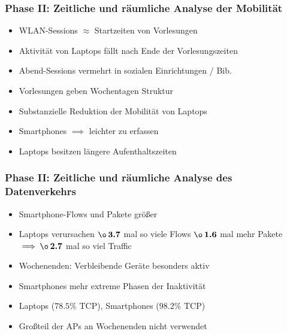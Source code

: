 \documentclass{beamer}
\begin{document}
\begin{frame}
  \frametitle{Phase II: Zeitliche und räumliche Analyse der Mobilität}
  \begin{itemize}
    \item WLAN-Sessions $\approx$ Startzeiten von Vorlesungen
    \item Aktivität von Laptops fällt nach Ende der Vorlesungszeiten
    \item Abend-Sessions vermehrt in sozialen Einrichtungen / Bib.
    \item Vorlesungen geben Wochentagen Struktur
    \item Substanzielle Reduktion der Mobilität von Laptops
    \item Smartphones  $\implies$ leichter zu erfassen
    \item Laptops besitzen längere Aufenthaltszeiten 
  \end{itemize}
\end{frame}

\begin{frame}
  \frametitle{Phase II: Zeitliche und räumliche Analyse des Datenverkehrs}
  \begin{itemize}
    \item Smartphone-Flows und Pakete größer
    \item Laptops verursachen $\boldsymbol{\o \thinspace 3.7}$ mal so viele Flows\newline
    \phantom \quad\quad\quad\quad\quad\quad\quad\quad\thinspace\thinspace\thinspace\thinspace\thinspace $\boldsymbol{\o \thinspace 1.6}$ mal mehr Pakete\newline
    \phantom \quad\quad\quad\quad\quad\quad\thinspace\thinspace $\implies \boldsymbol{\o \thinspace 2.7}$ mal so viel Traffic
    \item Wochenenden: Verbleibende Geräte besonders aktiv
    \item Smartphones mehr extreme Phasen der Inaktivität
    \item Laptops ($\boldsymbol{78.5 \%}$ TCP), Smartphones ($\boldsymbol{98.2 \%}$ TCP)
    \item Großteil der APs an Wochenenden nicht verwendet
  \end{itemize}
\end{frame}
\end{document}
